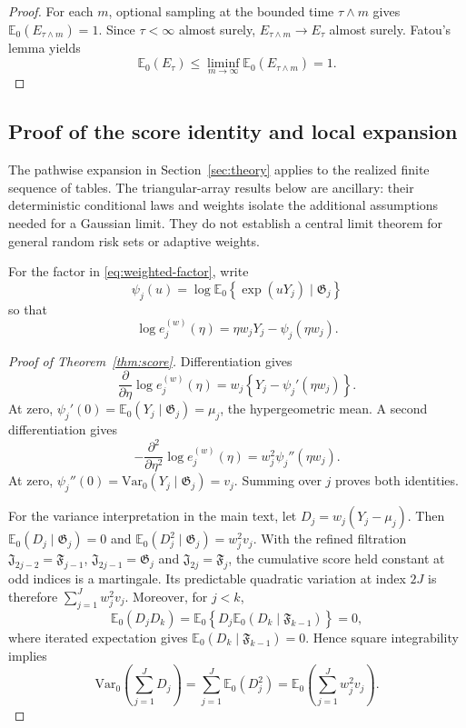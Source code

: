 \documentclass[12pt]{article}
\theoremstyle{definition}
\theoremstyle{remark}
\begin{document}
\begin{proof}
For each $m$, optional sampling at the bounded time $\tau\wedge m$ gives $\mathbb E_0(E_{\tau\wedge m})=1$. Since $\tau<\infty$ almost surely, $E_{\tau\wedge m}\to E_\tau$ almost surely. Fatou's lemma yields
\[
 \mathbb E_0(E_\tau)\leq\liminf_{m\to\infty}\mathbb E_0(E_{\tau\wedge m})=1.
\]
\end{proof}



\subsection{Proof of the score identity and local expansion}

The pathwise expansion in Section~\ref{sec:theory} applies to the realized finite sequence of tables. The triangular-array results below are ancillary: their deterministic conditional laws and weights isolate the additional assumptions needed for a Gaussian limit. They do not establish a central limit theorem for general random risk sets or adaptive weights.

For the factor in \eqref{eq:weighted-factor}, write
\[
 \psi_j(u)=\log\mathbb E_0\left\{\exp\left(uY_j\right)\mid\mathfrak G_j\right\}
\]
so that
\[
 \log e_j^{(w)}(\eta)=\eta w_jY_j-\psi_j(\eta w_j).
\]

\begin{proof}[Proof of Theorem~\ref{thm:score}]
Differentiation gives
\[
 \frac{\partial}{\partial\eta}\log e_j^{(w)}(\eta)
 =w_j\left\{Y_j-\psi_j'(\eta w_j)\right\}.
\]
At zero, $\psi_j'(0)=\mathbb E_0(Y_j\mid\mathfrak G_j)=\mu_j$, the hypergeometric mean. A second differentiation gives
\[
 -\frac{\partial^2}{\partial\eta^2}\log e_j^{(w)}(\eta)
 =w_j^2\psi_j''(\eta w_j).
\]
At zero, $\psi_j''(0)=\mathrm{Var}_0(Y_j\mid\mathfrak G_j)=v_j$. Summing over $j$ proves both identities.

For the variance interpretation in the main text, let $D_j=w_j(Y_j-\mu_j)$. Then $\mathbb E_0(D_j\mid\mathfrak G_j)=0$ and $\mathbb E_0(D_j^2\mid\mathfrak G_j)=w_j^2v_j$. With the refined filtration $\mathfrak J_{2j-2}=\mathfrak F_{j-1}$, $\mathfrak J_{2j-1}=\mathfrak G_j$ and $\mathfrak J_{2j}=\mathfrak F_j$, the cumulative score held constant at odd indices is a martingale. Its predictable quadratic variation at index $2J$ is therefore $\sum_{j=1}^J w_j^2v_j$. Moreover, for $j<k$,
\[
 \mathbb E_0(D_jD_k)
 =\mathbb E_0\left\{D_j\mathbb E_0(D_k\mid\mathfrak F_{k-1})\right\}=0,
\]
where iterated expectation gives $\mathbb E_0(D_k\mid\mathfrak F_{k-1})=0$. Hence square integrability implies
\[
 \mathrm{Var}_0\left(\sum_{j=1}^{J}D_j\right)
 =\sum_{j=1}^J\mathbb E_0(D_j^2)
 =\mathbb E_0\left(\sum_{j=1}^J w_j^2v_j\right).
\]
\end{proof}
\end{document}
